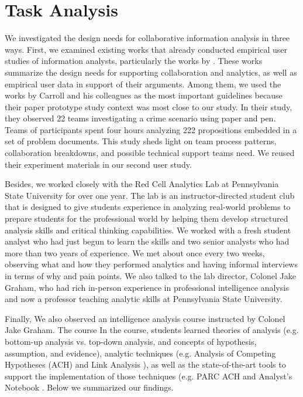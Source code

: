 \section{Task Analysis}

We investigated the design needs for collaborative information analysis in three ways. First, we examined existing works that already conducted empirical user studies of information analysts, particularly the works by \citep{Chin2009,Carroll2013,Pirolli2005, Kang2012,Kang2012d}. These works summarize the design needs for supporting collaboration and analytics, as well as empirical user data in support of their arguments. Among them, we used the works by Carroll and his colleagues \citep{Carroll2013,Borge2012,Borge2014} as the most important guidelines because their paper prototype study context was most close to our study. In their study, they observed 22 teams investigating a crime scenario using paper and pen. Teams of participants spent four hours analyzing 222 propositions embedded in a set of problem documents. This study sheds light on team process patterns, collaboration breakdowns, and possible technical support teams need. We reused their experiment materials in our second user study.

Besides, we worked closely with the Red Cell Analytics Lab at Pennsylvania State University for over one year. The lab is an instructor-directed student club that is designed to give students experience in analyzing real-world problems to prepare students for the professional world by helping them develop structured analysis skills and critical thinking capabilities. We worked with a fresh student analyst who had just begun to learn the skills and two senior analysts who had more than two years of experience. We met about once every two weeks, observing what and how they performed analytics and having informal interviews in terms of why and pain points.  We also talked to the lab director, Colonel Jake Graham, who had rich in-person experience in professional intelligence analysis and now a professor teaching analytic skills at Pennsylvania State University. 

Finally, We also observed an intelligence analysis course instructed by Colonel Jake Graham. The course  In the course, students learned theories of analysis (e.g. bottom-up analysis vs. top-down analysis, and concepts of hypothesis, assumption, and evidence), analytic techniques (e.g. Analysis of Competing Hypotheses (ACH) \citep{Heuer1999} and Link Analysis \citep{Sparrow1991}), as well as the state-of-the-art tools to support the implementation of those techniques (e.g. PARC ACH \citep{PARC} and Analyst’s Notebook \citep{IBM}. Below we summarized our findings.

